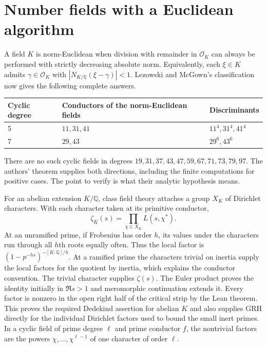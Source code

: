 \documentclass[11pt]{article}
\newcommand{\Q}{\mathbb Q}\newcommand{\R}{\mathbb R}
\begin{document}
\section{Number fields with a Euclidean algorithm}
A field $K$ is norm-Euclidean when division with remainder in $\mathcal O_K$ can always be performed with strictly decreasing absolute norm. Equivalently, each $\xi\in K$ admits $\gamma\in\mathcal O_K$ with $|N_{K/\Q}(\xi-\gamma)|<1$. Lezowski and McGown's classification now gives the following complete answers.
\begin{center}
\begin{tabular}{@{}lll@{}}\toprule
Cyclic degree & Conductors of the norm-Euclidean fields & Discriminants\\\midrule
5 & $11,31,41$ & $11^4,31^4,41^4$\\
7 & $29,43$ & $29^6,43^6$\\\bottomrule
\end{tabular}
\end{center}
There are no such cyclic fields in degrees $19,31,37,43,47,59,67,71,73,79,97$. The authors' theorem supplies both directions, including the finite computations for positive cases. The point to verify is what their analytic hypothesis means.

For an abelian extension $K/\Q$, class field theory attaches a group $X_K$ of Dirichlet characters. With each character taken at its primitive conductor,
\begin{equation}\label{eq:abel}
             \zeta_K(s)=\prod_{\chi\in X_K} L(s,\chi^*).
\end{equation}
At an unramified prime, if Frobenius has order $h$, its values under the characters run through all $h$th roots equally often. Thus the local factor is $(1-p^{-hs})^{-[K:\Q]/h}$. At a ramified prime the characters trivial on inertia supply the local factors for the quotient by inertia, which explains the conductor convention. The trivial character supplies $\zeta(s)$. The Euler product proves the identity initially in $\Re s>1$ and meromorphic continuation extends it. Every factor is nonzero in the open right half of the critical strip by the Lean theorem. This proves the required Dedekind assertion for abelian $K$ and also supplies GRH directly for the individual Dirichlet factors used to bound the small inert primes. In a cyclic field of prime degree $\ell$ and prime conductor $f$, the nontrivial factors are the powers $\chi,\ldots,\chi^{\ell-1}$ of one character of order $\ell$.
\end{document}
